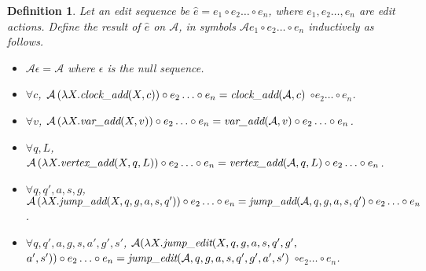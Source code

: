 \documentclass[10pt, a4paper, onecolumn, conference, compsocconf]{IEEEtran}
\newcommand{\mcla}{\mathcal{A}}
\newcommand{\emvadd}{\mbox{\em vertex\_add}}
\newcommand{\emcadd}{\mbox{\em clock\_add}}
\newcommand{\emvaradd}{\mbox{\em var\_add}}
\newcommand{\emjadd}{\mbox{\em jump\_add}}
\newcommand{\emjedt}{\mbox{\em jump\_edit}}
\newtheorem{defi}{Definition}
\begin{document}
\begin{defi}
Let an edit sequence be $\hat{e}=e_1\circ e_2\ldots \circ e_n$, where $e_1,e_2\ldots ,e_n$ are edit actions.
Define the result of $\hat{e}$ on $\mcla$, in symbols $\mcla
e_1 \circ e_2\ldots \circ e_n$ inductively as follows.
\begin{itemize}
\item $\mcla \epsilon=\mcla$ where $\epsilon$ is the null sequence.
\item $\forall c$, $\mcla\left(\lambda X.\emcadd(X,c)\right) \circ e_2\ldots \circ e_n= \emcadd(\mcla,c)$ $\circ e_2 \ldots \circ  e_n$.
\item $\forall v$, $\mcla\left(\lambda X.\emvaradd(X,v)\right) \circ e_2\ldots \circ e_n= \emvaradd(\mcla,v) \circ e_2 \ldots \circ  e_n$.
\item $\forall q,L$, $\mcla\left(\lambda
X.\emvadd(X,q,L)\right) \circ e_2\ldots \circ  e_n = \emvadd(\mcla,q,L) \circ e_2\ldots \circ  e_n$.

\item $\forall q,q',a,s, g$, $\mcla\left(\lambda X.\emjadd(X,q,g,a,s,q')\right) \circ e_2\ldots \circ  e_n
    = \emjadd(\mcla,q,g, a,s,q') \circ e_2\ldots \circ  e_n$.
\item $\forall q,q',a,g,s,a',g',s'$, $\mcla (\lambda X.\emjedt(X,q,g,a,s,q',g',$ $a',s')) \circ e_2\ldots \circ  e_n
    = \emjedt(\mcla,q,g,a,s,q',g',a',s')$ $ \circ e_2\ldots \circ  e_n$.
\end{itemize}
\end{defi}
\end{document}
